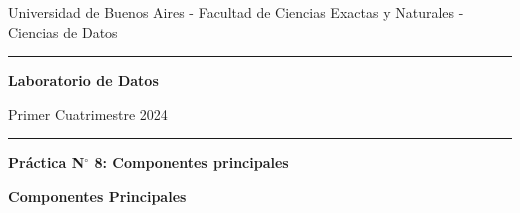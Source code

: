 \documentclass[12pt]{article}
\begin{document}
\centerline{{\small Universidad de Buenos Aires - Facultad de Ciencias Exactas y Naturales - Ciencias de Datos}}

\vskip 0.2cm

\hrule

\vskip 0.2cm

 \centerline{{\bf\Large{\sc Laboratorio de Datos}}}

 \vskip 0.2cm

 \centerline{\ttfamily Primer Cuatrimestre 2024}

\vskip 0.2cm

 \hrule

 \bigskip
 \centerline{\bf Pr\'actica N$^\circ$ 8: Componentes principales}
 \bigskip


\thispagestyle{plain}




%
%
%


\textbf{Componentes Principales}
\end{document}

